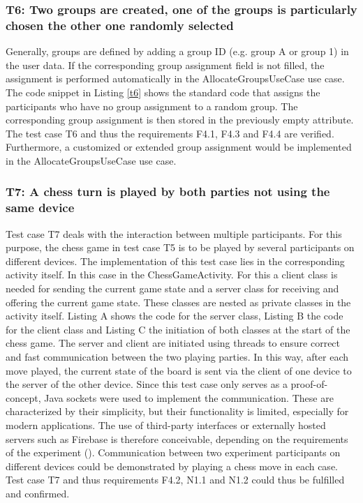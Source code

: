 \subsubsection*{T6: Two groups are created, one of the groups is particularly chosen the other one randomly selected}

Generally, groups are defined by adding a group ID (e.g. group A or group 1) in the user data. If the corresponding group assignment field is not filled, the assignment is performed automatically in the AllocateGroupsUseCase use case. The code snippet in Listing \ref{t6} shows the standard code that assigns the participants who have no group assignment to a random group. The corresponding group assignment is then stored in the previously empty attribute. The test case T6 and thus the requirements F4.1, F4.3 and F4.4 are verified. Furthermore, a customized or extended group assignment would be implemented in the AllocateGroupsUseCase use case.

\subsubsection*{T7: A chess turn is played by both parties not using the same device}

Test case T7 deals with the interaction between multiple participants. For this purpose, the chess game in test case T5 is to be played by several participants on different devices. The implementation of this test case lies in the corresponding activity itself. In this case in the ChessGameActivity. For this a client class is needed for sending the current game state and a server class for receiving and offering the current game state. These classes are nested as private classes in the activity itself. Listing A shows the code for the server class, Listing B the code for the client class and Listing C the initiation of both classes at the start of the chess game. The server and client are initiated using threads to ensure correct and fast communication between the two playing parties. In this way, after each move played, the current state of the board is sent via the client of one device to the server of the other device. Since this test case only serves as a proof-of-concept, Java sockets were used to implement the communication. These are characterized by their simplicity, but their functionality is limited, especially for modern applications. The use of third-party interfaces or externally hosted servers such as Firebase is therefore conceivable, depending on the requirements of the experiment (\cite{Google.2023b}). Communication between two experiment participants on different devices could be demonstrated by playing a chess move in each case. Test case T7 and thus requirements F4.2, N1.1 and N1.2 could thus be fulfilled and confirmed.

